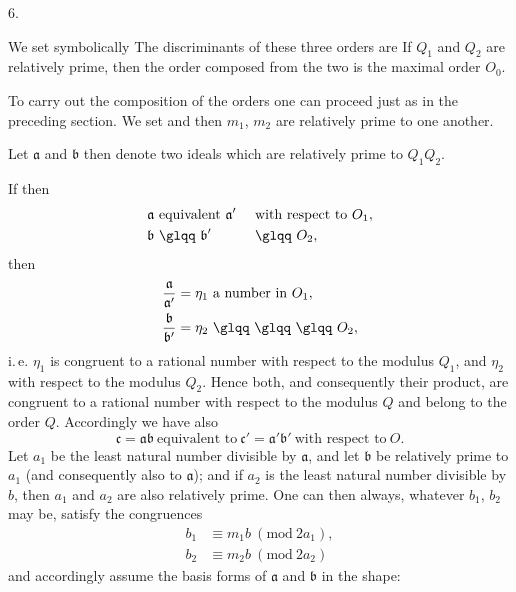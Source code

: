 6. 

We set symbolically
The discriminants of these three orders are
If $Q_1$ and $Q_2$ are relatively prime, then the order composed from the two is the maximal order $O_0$.

To carry out the composition of the orders one can proceed just as in the preceding section. We set
and then $m_1$, $m_2$ are relatively prime to one another.

Let $\mathfrak{a}$ and $\mathfrak{b}$ then denote two ideals which are relatively prime to $Q_1 Q_2$.

If then
\[
\begin{aligned}
\mathfrak{a}&\ \text{equivalent}\ \mathfrak{a}'&&\ \text{with respect to}\ O_1,\\
\mathfrak{b}&\ \text{\glqq}\ \mathfrak{b}'&&\ \text{\glqq}\ O_2,
\end{aligned}
\]
then
\[
\begin{aligned}
\frac{\mathfrak{a}}{\mathfrak{a}'}&=\eta_1\ \text{a number in}\ O_1,\\
\frac{\mathfrak{b}}{\mathfrak{b}'}&=\eta_2\ \text{\glqq}\ \text{\glqq}\ \text{\glqq}\ O_2,
\end{aligned}
\]
i.\,e. $\eta_1$ is congruent to a rational number with respect to the modulus $Q_1$, and $\eta_2$ with respect to the modulus $Q_2$. Hence both, and consequently their product, are congruent to a rational number with respect to the modulus $Q$ and belong to the order $Q$. %
Accordingly we have also
\[
\mathfrak{c} = \mathfrak{a}\mathfrak{b} \ \text{equivalent to} \ \mathfrak{c}' = \mathfrak{a}'\mathfrak{b}' \ \text{with respect to} \ O.
\]
Let $a_1$ be the least natural number divisible by $\mathfrak{a}$, and let $\mathfrak{b}$ be relatively prime to $a_1$ (and consequently also to $\mathfrak{a}$); and if $a_2$ is the least natural number divisible by $b$, then $a_1$ and $a_2$ are also relatively prime. %
One can then always, whatever $b_1$, $b_2$ may be, satisfy the congruences
\[
\begin{aligned}
b_1 &\equiv m_1 b \ (\mathrm{mod}\ 2a_1),\\
b_2 &\equiv m_2 b \ (\mathrm{mod}\ 2a_2)
\end{aligned}
\]
and accordingly assume the basis forms of $\mathfrak{a}$ and $\mathfrak{b}$ in the shape:
